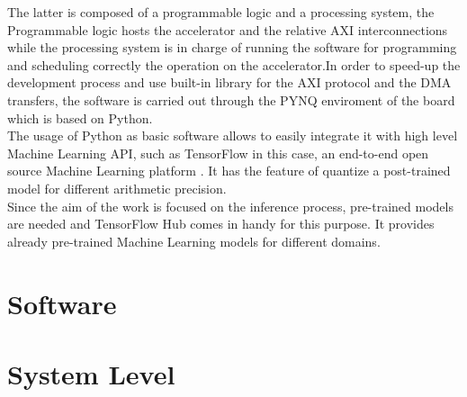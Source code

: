 The latter is composed of a programmable logic and a processing system, the Programmable logic hosts the accelerator and the relative AXI interconnections while the processing system is in charge of running the software for programming and scheduling correctly the operation on the accelerator.\newline In order to speed-up the development process and use built-in library for the AXI protocol and the DMA transfers, the software is carried out through the PYNQ enviroment of the board \cite{WEBSITE:2} which is based on Python. \\
The usage of Python as basic software allows to easily integrate it with high level Machine Learning API, such as TensorFlow in this case, an end-to-end open source Machine Learning platform \cite{WEBSITE:4}. It has the feature of quantize a post-trained model for different arithmetic precision.\\
Since the aim of the work is focused on the inference process, pre-trained models are needed and TensorFlow Hub \cite{WEBSITE:5} comes in handy for this purpose. It provides already pre-trained Machine Learning models for different domains.

\section{Software}
\section{System Level}

